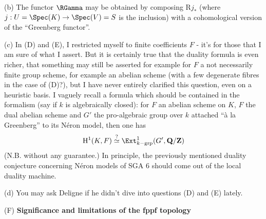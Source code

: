 (b) The functor $\RGamma$ may be obtained by composing $\mathrm{R}j_*$ (where $j: U = \Spec(K) \to \Spec(V) = S$ is the inclusion) with a cohomological version of the ``Greenberg functor''.

(c) In (D) and (E), I restricted myself to finite coefficients $F$ - it's for those that I am sure of what I assert. But it is certainly true that the duality formula is even richer, that something may still be asserted for example for $F$ a not necessarily finite group scheme, for example an abelian scheme (with a few degenerate fibres in the case of (D)?), but I have never entirely clarified this question, even on a heuristic basis. I vaguely recall a formula which should be contained in the formalism (say if $k$ is algebraically closed): for $F$ an abelian scheme on $K$, $F$ the dual abelian scheme and $G'$ the pro-algebraic group over $k$ attached ``à la Greenberg'' to its Néron model, then one has
$$
\mathrm{H}^1(K, F) \stackrel{?}{\simeq} \Ext^1_{k-\text{grp}}(G', \mathbf{Q}/\mathbf{Z})
$$
(N.B. without any guarantee.) In principle, the previously mentioned duality conjecture concerning Néron models of SGA 6 should come out of the local duality machine.

(d) You may ask Deligne if he didn't dive into questions (D) and (E) lately.

\label{sec:app14}%
(F) \textbf{Significance and limitations of the fppf topology}
    
